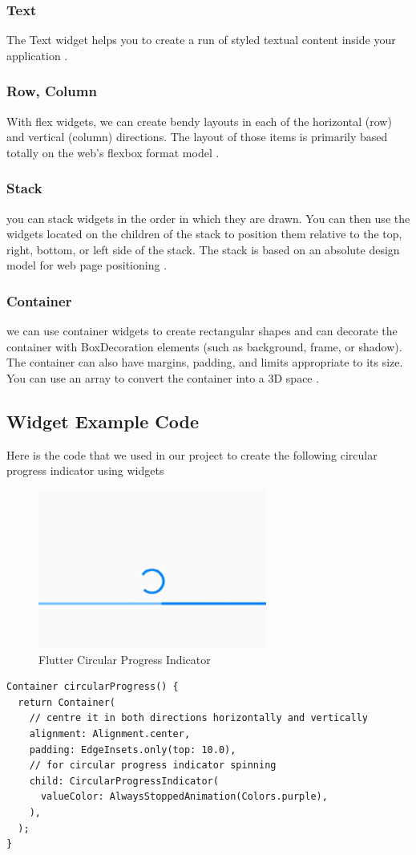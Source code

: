 \subsubsection{Text}
The Text widget helps you to create a run of styled textual content inside your application \cite{widgetsFlutterDev:online}.
\subsubsection{Row, Column}
With flex widgets, we can create bendy layouts in each of the horizontal (row) and vertical (column) directions. The layout of those items is primarily based totally on the web’s flexbox format model \cite{widgetsFlutterDev:online}.
\subsubsection{Stack}
you can stack widgets in the order in which they are drawn. You can then use the widgets located on the children of the stack to position them relative to the top, right, bottom, or left side of the stack. The stack is based on an absolute design model for web page positioning \cite{widgetsFlutterDev:online}.
\subsubsection{Container}
we can use container widgets to create rectangular shapes and can decorate the container with BoxDecoration elements (such as background, frame, or shadow). The container can also have margins, padding, and limits appropriate to its size. You can use an array to convert the container into a 3D space \cite{widgetsFlutterDev:online}.
\subsection{Widget Example Code}
Here is the code that we used in our project to create the following circular progress indicator using widgets
\begin{figure}[!htb]
    \centering
    \includegraphics{img/circular progress indicator.PNG}
    \caption{Flutter Circular Progress Indicator}
    \label{fig:Flutter Circular Progress Indicator}
\end{figure}
\begin{verbatim}
Container circularProgress() {
  return Container(
    // centre it in both directions horizontally and vertically
    alignment: Alignment.center,
    padding: EdgeInsets.only(top: 10.0),
    // for circular progress indicator spinning
    child: CircularProgressIndicator(
      valueColor: AlwaysStoppedAnimation(Colors.purple),
    ),
  );
}
\end{verbatim}

